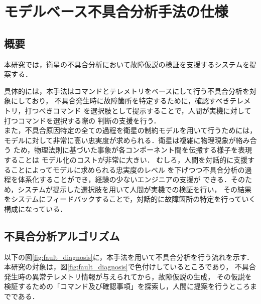 \documentclass[11pt]{jsreport}
\begin{document}
\fi

\chapter{モデルベース不具合分析手法の仕様}

\section{概要}
本研究では，衛星の不具合分析において故障仮説の検証を支援するシステムを提案する．

具体的には，本手法はコマンドとテレメトリをベースにして行う不具合分析を対象にしており，
不具合発生時に故障箇所を特定するために，確認すべきテレメトリ，打つべきコマンド
を選択肢として提示することで，人間が実機に対して打つコマンドを選択する際の
判断の支援を行う．\\
また，不具合原因特定の全ての過程を衛星の制約モデルを用いて行うためには，%
モデルに対して非常に高い忠実度が求められる．衛星は複雑に物理現象が絡み合う
ため，物理法則に基づいた事象が各コンポーネント間を伝搬する様子を表現することは
モデル化のコストが非常に大きい．
むしろ，人間を対話的に支援することによってモデルに求められる忠実度のレベル
を下げつつ不具合分析の過程を体系化することができ，経験の少ないエンジニアの支援が
できる．そのため，システムが提示した選択肢を用いて人間が実機での検証を行い，
その結果をシステムにフィードバックすることで，対話的に故障箇所の特定を行っていく
構成になっている．\\

\section{不具合分析アルゴリズム}
以下の図\ref{fig:fault_diagnosis}に，本手法を用いて不具合分析を行う流れを示す．
本研究の対象は，図\ref{fig:fault_diagnosis}で色付けしているところであり，
不具合発生時の異常テレメトリ情報が与えられてから，故障仮説の生成，
その仮説を検証するための「コマンド及び確認事項」を探索し，人間に提案を行うところまでである．
\end{document}
